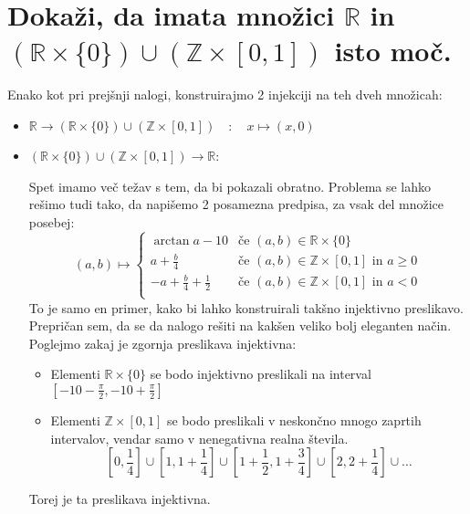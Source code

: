 \documentclass[a4paper, 12pt]{article}
\newcommand{\ZZ}{\ensuremath{\mathbb{Z}}}
\newcommand{\RR}{\ensuremath{\mathbb{R}}}
\begin{document}
    \section{Dokaži, da imata množici $\RR$ in $(\RR \times \{0\}) \cup (\ZZ \times [0, 1])$ isto moč.}
    
    Enako kot pri prejšnji nalogi, konstruirajmo 2 injekciji na teh dveh množicah:
    \begin{itemize}
        \item $\RR \to (\RR \times \{0\}) \cup (\ZZ \times [0, 1]) \quad : \quad x \mapsto (x, 0)$
        \item $(\RR \times \{0\}) \cup (\ZZ \times [0, 1]) \to \RR$:
        
        Spet imamo več težav s tem, da bi pokazali obratno. Problema se lahko rešimo tudi tako, da napišemo 2 posamezna predpisa, za vsak del množice posebej:
        \[
        (a, b) \mapsto \left\{ \begin{array}{ll}
            \arctan a - 10 & \text{če } (a, b) \in \RR \times \{0\} \\
            a + \frac{b}{4} & \text{če } (a, b) \in \ZZ \times [0, 1] \text{ in } a \geq 0 \\
            -a + \frac{b}{4} + \frac{1}{2} & \text{če } (a, b) \in \ZZ \times [0, 1] \text{ in } a < 0 \\
            \end{array}
            \right.
        \]
        To je samo en primer, kako bi lahko konstruirali takšno injektivno preslikavo. Prepričan sem, da se da nalogo rešiti na kakšen veliko bolj eleganten način. Poglejmo zakaj je zgornja preslikava injektivna:
        \begin{itemize}
            \item Elementi $\RR \times \{0\}$ se bodo injektivno preslikali na interval \\$[-10-\frac{\pi}{2},-10 + \frac{\pi}{2}]$
            \item Elementi  $\ZZ \times [0, 1]$ se bodo preslikali v neskončno mnogo zaprtih intervalov, vendar samo v nenegativna realna števila.
            \[
            \left[0, \frac{1}{4}\right] \cup \left[1, 1+\frac{1}{4}\right] \cup \left[1+\frac{1}{2}, 1+\frac{3}{4}\right] \cup \left[2, 2+\frac{1}{4}\right] \cup \ldots
            \]
        \end{itemize}
        Torej je ta preslikava injektivna.
    \end{itemize}
\end{document}
